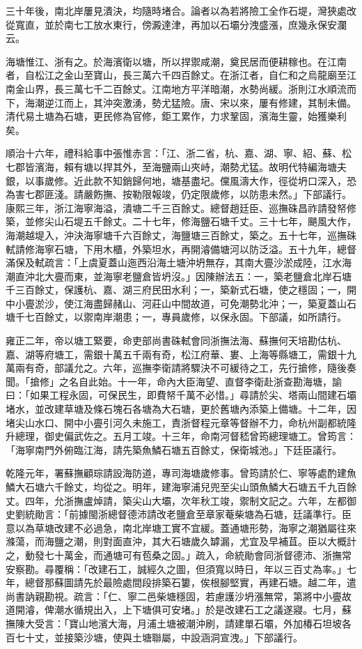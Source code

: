 \begin{pinyinscope}
三十年後，南北岸屢見潰決，均隨時堵合。論者以為若將險工全作石堤，灣狹處改從寬直，並於南七工放水東行，傍澱達津，再加以石壩分洩盛漲，庶幾永保安瀾云。

海塘惟江、浙有之。於海濱衛以塘，所以捍禦咸潮，奠民居而便耕稼也。在江南者，自松江之金山至寶山，長三萬六千四百餘丈。在浙江者，自仁和之烏龍廟至江南金山界，長三萬七千二百餘丈。江南地方平洋暗潮，水勢尚緩。浙則江水順流而下，海潮逆江而上，其沖突激湧，勢尤猛險。唐、宋以來，屢有修建，其制未備。清代易土塘為石塘，更民修為官修，鉅工累作，力求鞏固，濱海生靈，始獲樂利矣。

順治十六年，禮科給事中張惟赤言：「江、浙二省，杭、嘉、湖、寧、紹、蘇、松七郡皆濱海，賴有塘以捍其外，至海鹽兩山夾峙，潮勢尤猛。故明代特編海塘夫銀，以事歲修。近此款不知銷歸何地，塘基盡圮。儻風濤大作，徑從坍口深入，恐為害七郡匪淺。請嚴飭撫、按勒限報竣，仍定限歲修，以防患未然。」下部議行。康熙三年，浙江海寧海溢，潰塘二千三百餘丈。總督趙廷臣、巡撫硃昌祚請發帑修築，並修尖山石堤五千餘丈。二十七年，修海鹽石塘千丈。三十七年，颶風大作，海潮越堤入，沖決海寧塘千六百餘丈，海鹽塘三百餘丈，築之。五十七年，巡撫硃軾請修海寧石塘，下用木櫃，外築坦水，再開濬備塘河以防泛溢。五十九年，總督滿保及軾疏言：「上虞夏蓋山迤西沿海土塘沖坍無存，其南大亹沙淤成陸，江水海潮直沖北大亹而東，並海寧老鹽倉皆坍沒。」因陳辦法五：一，築老鹽倉北岸石塘千三百餘丈，保護杭、嘉、湖三府民田水利；一，築新式石塘，使之穩固；一，開中小亹淤沙，使江海盡歸赭山、河莊山中間故道，可免潮勢北沖；一，築夏蓋山石塘千七百餘丈，以禦南岸潮患；一，專員歲修，以保永固。下部議，如所請行。

雍正二年，帝以塘工緊要，命吏部尚書硃軾會同浙撫法海、蘇撫何天培勘估杭、嘉、湖等府塘工，需銀十萬五千兩有奇，松江府華、婁、上海等縣塘工，需銀十九萬兩有奇，部議允之。六年，巡撫李衛請將驟決不可緩待之工，先行搶修，隨後奏聞。「搶修」之名自此始。十一年，命內大臣海望、直督李衛赴浙查勘海塘，諭曰：「如果工程永固，可保民生，即費帑千萬不必惜。」尋請於尖、塔兩山間建石壩堵水，並改建草塘及條石塊石各塘為大石塘，更於舊塘內添築上備塘。十二年，因堵尖山水口、開中小亹引河久未施工，責浙督程元章等督辦不力，命杭州副都統隆升總理，御史偏武佐之。五月工竣。十三年，命南河督嵇曾筠總理塘工。曾筠言：「海寧南門外俯臨江海，請先築魚鱗石塘五百餘丈，保衛城池。」下廷臣議行。

乾隆元年，署蘇撫顧琮請設海防道，專司海塘歲修事。曾筠請於仁、寧等處酌建魚鱗大石塘六千餘丈，均從之。明年，建海寧浦兒兜至尖山頭魚鱗大石塘五千九百餘丈。四年，允浙撫盧焯請，築尖山大壩，次年秋工竣，禦制文記之。六年，左都御史劉統勛言：「前據閩浙總督德沛請改老鹽倉至章家菴柴塘為石塘，廷議準行。臣意以為草塘改建不必過急，南北岸塘工實不宜緩。蓋通塘形勢，海寧之潮猶屬往來滌蕩，而海鹽之潮，則對面直沖，其大石塘歲久罅漏，尤宜及早補苴。臣以大概計之，動發七十萬金，而通塘可有苞桑之固。」疏入，命統勛會同浙督德沛、浙撫常安察勘。尋覆稱：「改建石工，誠經久之圖，但須寬以時日，年以三百丈為率。」七年，總督那蘇圖請先於最險處間段排築石簍，俟根腳堅實，再建石塘。越二年，遣尚書訥親勘視。疏言：「仁、寧二邑柴塘穩固，若慮護沙坍漲無常，第將中小亹故道開濬，俾潮水循規出入，上下塘俱可安堵。」於是改建石工之議遂寢。七月，蘇撫陳大受言：「寶山地濱大海，月浦土塘被潮沖刷，請建單石壩，外加椿石坦坡各百七十丈，並接築沙塘，使與土塘聯屬，中設涵洞宣洩。」下部議行。


\end{pinyinscope}
